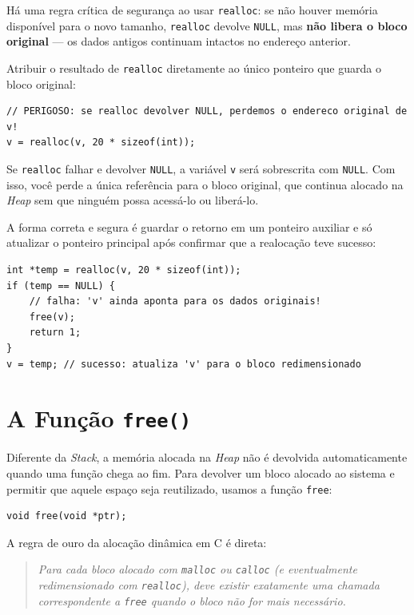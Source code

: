 Há uma regra crítica de segurança ao usar \texttt{realloc}: se não houver memória disponível para o novo tamanho, \texttt{realloc} devolve \texttt{NULL}, mas \textbf{não libera o bloco original} — os dados antigos continuam intactos no endereço anterior.

\begin{errocomum}
Atribuir o resultado de \texttt{realloc} diretamente ao único ponteiro que guarda o bloco original:
\begin{lstlisting}
// PERIGOSO: se realloc devolver NULL, perdemos o endereco original de v!
v = realloc(v, 20 * sizeof(int));
\end{lstlisting}
Se \texttt{realloc} falhar e devolver \texttt{NULL}, a variável \texttt{v} será sobrescrita com \texttt{NULL}. Com isso, você perde a única referência para o bloco original, que continua alocado na \textit{Heap} sem que ninguém possa acessá-lo ou liberá-lo.

A forma correta e segura é guardar o retorno em um ponteiro auxiliar e só atualizar o ponteiro principal após confirmar que a realocação teve sucesso:
\begin{lstlisting}
int *temp = realloc(v, 20 * sizeof(int));
if (temp == NULL) {
    // falha: 'v' ainda aponta para os dados originais!
    free(v);
    return 1;
}
v = temp; // sucesso: atualiza 'v' para o bloco redimensionado
\end{lstlisting}
\end{errocomum}

\section{A Função \texttt{free()}}
\label{sec:funcao-free}

Diferente da \textit{Stack}, a memória alocada na \textit{Heap} não é devolvida automaticamente quando uma função chega ao fim. Para devolver um bloco alocado ao sistema e permitir que aquele espaço seja reutilizado, usamos a função \texttt{free}:

\begin{lstlisting}
void free(void *ptr);
\end{lstlisting}

A regra de ouro da alocação dinâmica em C é direta:

\begin{quote}
\textit{Para cada bloco alocado com \texttt{malloc} ou \texttt{calloc} (e eventualmente redimensionado com \texttt{realloc}), deve existir exatamente uma chamada correspondente a \texttt{free} quando o bloco não for mais necessário.}
\end{quote}


